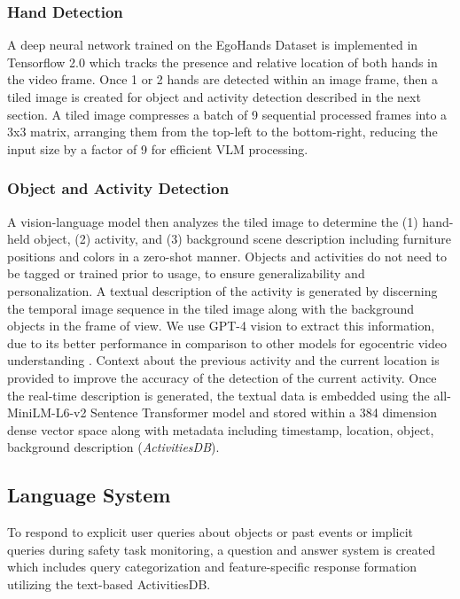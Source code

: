 \subsubsection{Hand Detection}

 A deep neural network trained on the EgoHands Dataset \cite{Dibia2017} is implemented in Tensorflow 2.0 which tracks the presence and relative location of both hands in the video frame. Once 1 or 2 hands are detected within an image frame, then a tiled image is created for object and activity detection described in the next section. A tiled image compresses a batch of 9 sequential processed frames into a 3x3 matrix, arranging them from the top-left to the bottom-right, reducing the input size by a factor of 9 for efficient VLM processing.  

\subsubsection{Object and Activity Detection}

A vision-language model then analyzes the tiled image to determine the (1) hand-held object, (2) activity, and (3) background scene description including furniture positions and colors in a zero-shot manner. Objects and activities do not need to be tagged or trained prior to usage, to ensure generalizability and personalization. A textual description of the activity is generated by discerning the temporal image sequence in the tiled image along with the background objects in the frame of view. We use GPT-4 vision to extract this information, due to its better performance in comparison to other models for egocentric video understanding \cite{vidcompare}. Context about the previous activity and the current location is provided to improve the accuracy of the detection of the current activity. Once the real-time description is generated, the textual data is embedded using the all-MiniLM-L6-v2 Sentence Transformer model and stored within a 384 dimension dense vector space along with metadata including timestamp, location, object, background description (\textit{ActivitiesDB}). 


\subsection{Language System}

To respond to explicit user queries about objects or past events or implicit queries during safety task monitoring, a question and answer system is created which includes query categorization and feature-specific response formation utilizing the text-based ActivitiesDB. \newline

